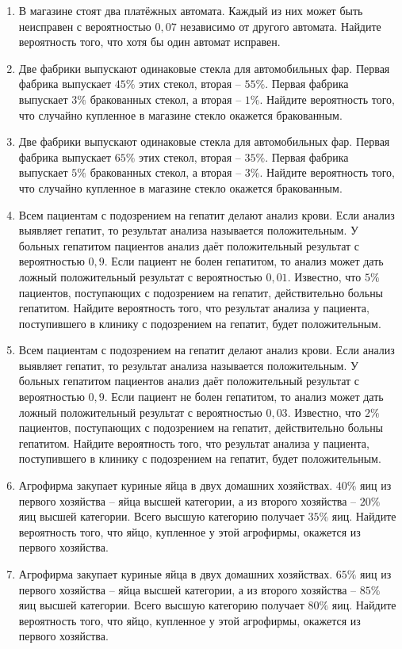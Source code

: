 \documentclass[12pt, a4paper]{article}
\begin{document}
\begin{enumerate}
		\item В магазине стоят два платёжных автомата. Каждый из них может быть неисправен с вероятностью \( 0,07 \) независимо от другого автомата. Найдите вероятность того, что хотя бы один автомат исправен.
		\item Две фабрики выпускают одинаковые стекла для автомобильных фар. Первая фабрика выпускает \( 45\% \) этих стекол, вторая – \( 55\% \). Первая фабрика выпускает \( 3\% \) бракованных стекол, а вторая – \( 1\% \). Найдите вероятность того, что случайно купленное в магазине стекло окажется бракованным.
		\item Две фабрики выпускают одинаковые стекла для автомобильных фар. Первая фабрика выпускает \( 65\% \) этих стекол, вторая – \( 35\% \). Первая фабрика выпускает \( 5\% \) бракованных стекол, а вторая – \( 3\% \). Найдите вероятность того, что случайно купленное в магазине стекло окажется бракованным.
		\item Всем пациентам с подозрением на гепатит делают анализ крови. Если анализ выявляет гепатит, то результат анализа называется положительным. У больных гепатитом пациентов анализ даёт положительный результат с вероятностью \( 0,9 \). Если пациент не болен гепатитом, то анализ может дать ложный положительный результат с вероятностью \( 0,01 \). Известно, что \( 5\% \) пациентов, поступающих с подозрением на гепатит, действительно больны гепатитом. Найдите вероятность того, что результат анализа у пациента, поступившего в клинику с подозрением на гепатит, будет положительным.
		\item Всем пациентам с подозрением на гепатит делают анализ крови. Если анализ выявляет гепатит, то результат анализа называется положительным. У больных гепатитом пациентов анализ даёт положительный результат с вероятностью \( 0,9 \). Если пациент не болен гепатитом, то анализ может дать ложный положительный результат с вероятностью \( 0,03 \). Известно, что \( 2\% \) пациентов, поступающих с подозрением на гепатит, действительно больны гепатитом. Найдите вероятность того, что результат анализа у пациента, поступившего в клинику с подозрением на гепатит, будет положительным.
		\item Агрофирма закупает куриные яйца в двух домашних хозяйствах. \( 40\%\) яиц из первого хозяйства – яйца высшей категории, а из второго хозяйства – \( 20\% \) яиц высшей категории. Всего высшую категорию получает \( 35\% \) яиц. Найдите вероятность того, что яйцо, купленное у этой агрофирмы, окажется из первого хозяйства.
		\item Агрофирма закупает куриные яйца в двух домашних хозяйствах. \( 65\% \) яиц из первого хозяйства – яйца высшей категории, а из второго хозяйства – \( 85\% \) яиц высшей категории. Всего высшую категорию получает \( 80\% \) яиц. Найдите вероятность того, что яйцо, купленное у этой агрофирмы, окажется из первого хозяйства.

\end{enumerate}
\end{document}
